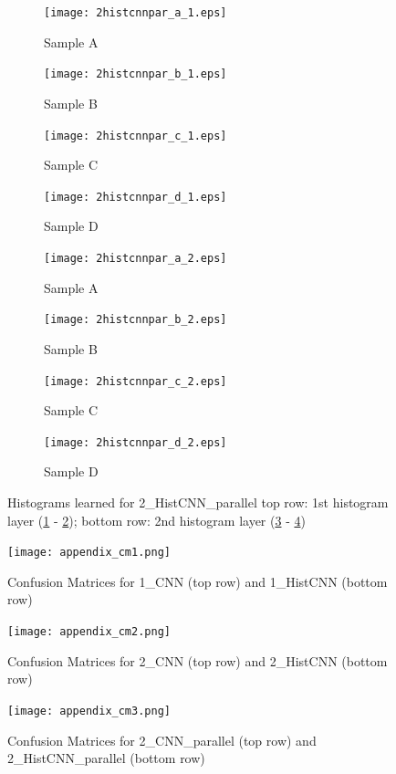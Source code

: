 \documentclass[10pt,twocolumn,letterpaper]{article}
\begin{document}
\begin{figure}[htb]
	\centering	
	\begin{subfigure}[b]{.20\textwidth}  %
		\centering
		\texttt{[image: 2histcnnpar\_a\_1.eps]}
		\caption{Sample A}
		\label{subfig:2histcnnpar_1a}
	\end{subfigure}
	\hfill
	\begin{subfigure}[b]{.20\textwidth}
		\centering
		\texttt{[image: 2histcnnpar\_b\_1.eps]}
		\caption{Sample B}
	\end{subfigure}
	\hfill
	\begin{subfigure}[b]{.20\textwidth}
		\centering
		\texttt{[image: 2histcnnpar\_c\_1.eps]}
		\caption{Sample C}
	\end{subfigure}
	\hfill
	\begin{subfigure}[b]{.20\textwidth}
		\centering
		\texttt{[image: 2histcnnpar\_d\_1.eps]}
		\caption{Sample D}
		\label{subfig:2histcnnpar_1d}
	\end{subfigure}	
	
	\begin{subfigure}[b]{.20\textwidth}  %
		\centering
		\texttt{[image: 2histcnnpar\_a\_2.eps]}
		\caption{Sample A}
		\label{subfig:2histcnnpar_2a}
	\end{subfigure}
	\hfill
	\begin{subfigure}[b]{.20\textwidth}
		\centering
		\texttt{[image: 2histcnnpar\_b\_2.eps]}
		\caption{Sample B}
	\end{subfigure}
	\hfill
	\begin{subfigure}[b]{.20\textwidth}
		\centering
		\texttt{[image: 2histcnnpar\_c\_2.eps]}
		\caption{Sample C}
	\end{subfigure}
	\hfill
	\begin{subfigure}[b]{.20\textwidth}
		\centering
		\texttt{[image: 2histcnnpar\_d\_2.eps]}
		\caption{Sample D}
		\label{subfig:2histcnnpar_2d}
	\end{subfigure}
	\caption{Histograms learned for 2\_HistCNN\_parallel top row: 1st histogram layer (\ref{subfig:2histcnnpar_1a} - \ref{subfig:2histcnnpar_1d}); bottom row: 2nd histogram layer (\ref{subfig:2histcnnpar_2a} - \ref{subfig:2histcnnpar_2d})}
	\label{fig:histogram}
\end{figure}

\begin{figure}[]
	\texttt{[image: appendix\_cm1.png]}
	\caption{Confusion Matrices for 1\_CNN (top row) and 1\_HistCNN (bottom row)}
	\label{fig:ap_cm1}
\end{figure}

\begin{figure}[]
	\texttt{[image: appendix\_cm2.png]}
	\caption{Confusion Matrices for 2\_CNN (top row) and 2\_HistCNN (bottom row)}
	\label{fig:ap_cm2}
\end{figure}

\begin{figure}[]
	\texttt{[image: appendix\_cm3.png]}
	\caption{Confusion Matrices for 2\_CNN\_parallel (top row) and 2\_HistCNN\_parallel (bottom row)}
	\label{fig:ap_cm2p}
\end{figure}
\end{document}
